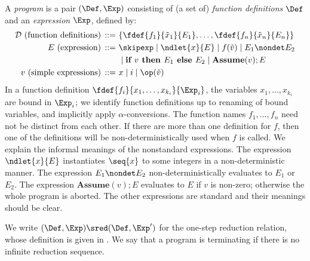 A \emph{program} is a pair \((\Def, \Exp)\) consisting of (a set of)
\emph{function definitions} \(\Def\) and
an \emph{expression} \(\Exp\), defined by:
\begin{align*}
    \mathcal{D} \ \text{(function definitions)}        \, ::=& \ \{ \fdef{f_1}{\tilde{x}_1}{E_1}, \ldots, \fdef{f_n}{\tilde{x}_n}{E_n} \} \\
    E           \ \text{(expression)}                  \, ::=& \ \skipexp
    \mid \ndlet{x}{E} \mid f(\tilde{v}) \mid E_1 \nondet E_2 \\
                                                             & \ \mid \textbf{if } v \textbf{ then } E_1 \textbf{ else } E_2 \mid \textbf{Assume}(v); E \\
    v           \ \text{(simple expressions)}                       \, ::=& \ x \mid i \mid \op(\tilde{v})
\end{align*}
In a function definition
\( \fdef{f_i}{x_1, \ldots , x_{k_i}}{\Exp_i} \),
the variables \( x_1, \ldots, x_{k_i} \)
are bound in \( \Exp_i \); we identify function definitions up to renaming of bound
variables, and implicitly apply \(\alpha\)-conversions.
The function names \( f_1, \ldots, f_n \) need not be distinct from each other.
  If there are more than one definition for \( f \), then one of the definitions
  will be non-deterministically used when \( f \) is called.
We explain the informal meanings of the nonstandard expressions.
The expression \( \ndlet{x}{E} \)
instantiates \(\seq{x}\) to some integers in a non-deterministic manner.
The expression \(E_1\nondet E_2\) non-deterministically evaluates to
\(E_1\) or \(E_2\).
The expression
\(\textbf{Assume}(v); E \) evaluates to \(E\) if \(v\) is non-zero;
otherwise the whole program is aborted.
The other expressions are standard and their meanings should be clear.

We write \((\Def,\Exp)\sred (\Def,\Exp')\)
for the one-step reduction relation, whose definition is given
in .
We say that a program is terminating if there is no infinite
reduction sequence.
